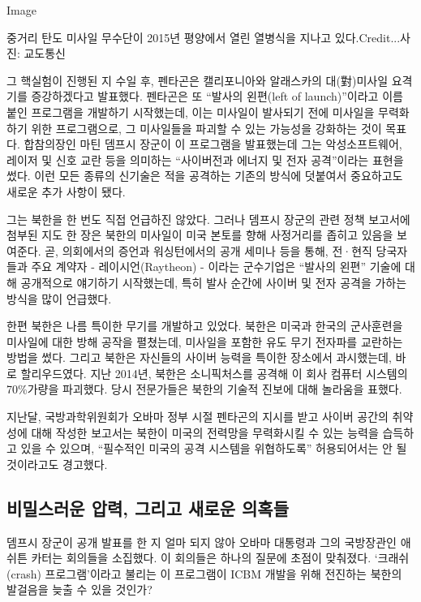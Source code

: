 Image

중거리 탄도 미사일 무수단이 2015년 평양에서 열린 열병식을 지나고
있다.Credit...사진: 교도통신

그 핵실험이 진행된 지 수일 후, 펜타곤은 캘리포니아와 알래스카의
대(對)미사일 요격기를 증강하겠다고 발표했다. 펜타곤은 또 ``발사의
왼편(left of launch)''이라고 이름 붙인 프로그램을 개발하기 시작했는데,
이는 미사일이 발사되기 전에 미사일을 무력화하기 위한 프로그램으로, 그
미사일들을 파괴할 수 있는 가능성을 강화하는 것이 목표다. 합참의장인 마틴
뎀프시 장군이 이 프로그램을 발표했는데 그는 악성소프트웨어, 레이저 및
신호 교란 등을 의미하는 ``사이버전과 에너지 및 전자 공격''이라는 표현을
썼다. 이런 모든 종류의 신기술은 적을 공격하는 기존의 방식에 덧붙여서
중요하고도 새로운 추가 사항이 됐다.

그는 북한을 한 번도 직접 언급하진 않았다. 그러나 뎀프시 장군의 관련 정책
보고서에 첨부된 지도 한 장은 북한의 미사일이 미국 본토를 향해 사정거리를
좁히고 있음을 보여준다. 곧, 의회에서의 증언과 워싱턴에서의 공개 세미나
등을 통해, 전·현직 당국자들과 주요 계약자 - 레이시언(Raytheon) - 이라는
군수기업은 ``발사의 왼편'' 기술에 대해 공개적으로 얘기하기 시작했는데,
특히 발사 순간에 사이버 및 전자 공격을 가하는 방식을 많이 언급했다.

한편 북한은 나름 특이한 무기를 개발하고 있었다. 북한은 미국과 한국의
군사훈련을 미사일에 대한 방해 공작을 펼쳤는데, 미사일을 포함한 유도 무기
전자파를 교란하는 방법을 썼다. 그리고 북한은 자신들의 사이버 능력을
특이한 장소에서 과시했는데, 바로 할리우드였다. 지난 2014년, 북한은
소니픽처스를 공격해 이 회사 컴퓨터 시스템의 70\%가량을 파괴했다. 당시
전문가들은 북한의 기술적 진보에 대해 놀라움을 표했다.

지난달, 국방과학위원회가 오바마 정부 시절 펜타곤의 지시를 받고 사이버
공간의 취약성에 대해 작성한 보고서는 북한이 미국의 전력망을 무력화시킬
수 있는 능력을 습득하고 있을 수 있으며, ``필수적인 미국의 공격 시스템을
위협하도록'' 허용되어서는 안 될 것이라고도 경고했다.

\hypertarget{uxbe44uxbc00uxc2a4uxb7ecuxc6b4-uxc555uxb825-uxadf8uxb9acuxace0-uxc0c8uxb85cuxc6b4-uxc758uxd639uxb4e4}{%
\subsection{비밀스러운 압력, 그리고 새로운
의혹들}\label{uxbe44uxbc00uxc2a4uxb7ecuxc6b4-uxc555uxb825-uxadf8uxb9acuxace0-uxc0c8uxb85cuxc6b4-uxc758uxd639uxb4e4}}

뎀프시 장군이 공개 발표를 한 지 얼마 되지 않아 오바마 대통령과 그의
국방장관인 애쉬튼 카터는 회의들을 소집했다. 이 회의들은 하나의 질문에
초점이 맞춰졌다. `크래쉬(crash) 프로그램'이라고 불리는 이 프로그램이
ICBM 개발을 위해 전진하는 북한의 발걸음을 늦출 수 있을 것인가?

